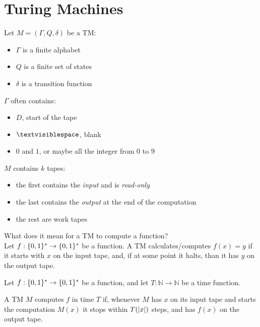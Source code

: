 \section{Turing Machines} \label{sec:tm}

\begin{definition} \label{def:tm}
    Let $M = (\Gamma, Q, \delta)$ be a TM:
    \begin{itemize}
        \item $\Gamma$ is a finite alphabet
        \item $Q$ is a finite set of states
        \item $\delta$ is a transition function
    \end{itemize}
\end{definition}

$\Gamma$ often contains:
\begin{itemize}
    \item $D$, start of the tape
    \item $\textvisiblespace$, blank
    \item $0$ and $1$, or maybe all the integer from $0$ to $9$
\end{itemize}

$M$ contains $k$ tapes:
\begin{itemize}
    \item the first contains the \textit{input} and is \textit{read-only}
    \item the last contains the \textit{output} at the end of the computation
    \item the rest are work tapes
\end{itemize}

What does it mean for a TM to compute a function?\\
Let $f : \{ 0,1 \}^* \rightarrow \{ 0,1 \}^*$ be a function. A TM calculates/computes $f(x) = y$ if it starts with $x$ on the input tape, and, if at some point it halts, than it has $y$ on the output tape.

\begin{definition} \label{def:tm_runningtime}
    Let $f : \{ 0,1 \}^* \rightarrow \{ 0,1 \}^*$ be a function, and let $T : \mathbb{N} \rightarrow \mathbb{N}$ be a time function.

    A TM $M$ computes $f$ in time $T$ if, whenever $M$ has $x$ on its input tape and starts the computation $M(x)$ it stops within $T(\vert x \vert)$ steps, and has $f(x)$ on the output tape.
\end{definition}

